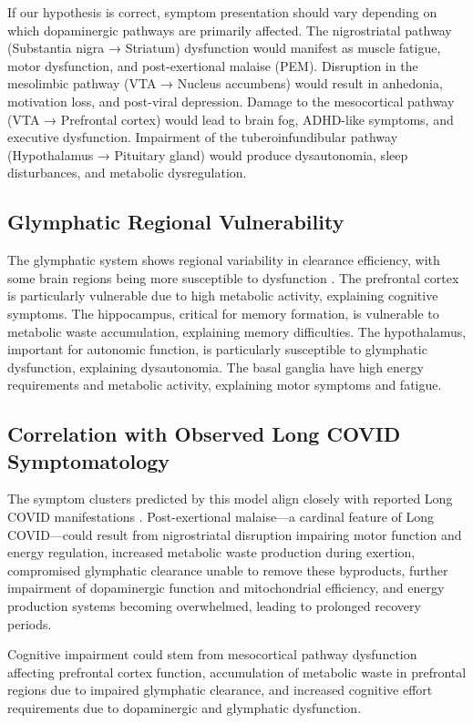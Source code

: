 \documentclass[12pt]{article}
\begin{document}
If our hypothesis is correct, symptom presentation should vary depending on which dopaminergic pathways are primarily affected. The nigrostriatal pathway (Substantia nigra → Striatum) dysfunction would manifest as muscle fatigue, motor dysfunction, and post-exertional malaise (PEM). Disruption in the mesolimbic pathway (VTA → Nucleus accumbens) would result in anhedonia, motivation loss, and post-viral depression. Damage to the mesocortical pathway (VTA → Prefrontal cortex) would lead to brain fog, ADHD-like symptoms, and executive dysfunction. Impairment of the tuberoinfundibular pathway (Hypothalamus → Pituitary gland) would produce dysautonomia, sleep disturbances, and metabolic dysregulation.

\subsection*{Glymphatic Regional Vulnerability}

The glymphatic system shows regional variability in clearance efficiency, with some brain regions being more susceptible to dysfunction \citep{Kress2014}. The prefrontal cortex is particularly vulnerable due to high metabolic activity, explaining cognitive symptoms. The hippocampus, critical for memory formation, is vulnerable to metabolic waste accumulation, explaining memory difficulties. The hypothalamus, important for autonomic function, is particularly susceptible to glymphatic dysfunction, explaining dysautonomia. The basal ganglia have high energy requirements and metabolic activity, explaining motor symptoms and fatigue.

\subsection*{Correlation with Observed Long COVID Symptomatology}

The symptom clusters predicted by this model align closely with reported Long COVID manifestations \citep{graham2021longcovidneuro, davis2021longcovidcohort}. Post-exertional malaise—a cardinal feature of Long COVID—could result from nigrostriatal disruption impairing motor function and energy regulation, increased metabolic waste production during exertion, compromised glymphatic clearance unable to remove these byproducts, further impairment of dopaminergic function and mitochondrial efficiency, and energy production systems becoming overwhelmed, leading to prolonged recovery periods.

Cognitive impairment could stem from mesocortical pathway dysfunction affecting prefrontal cortex function, accumulation of metabolic waste in prefrontal regions due to impaired glymphatic clearance, and increased cognitive effort requirements due to dopaminergic and glymphatic dysfunction.
\end{document}

